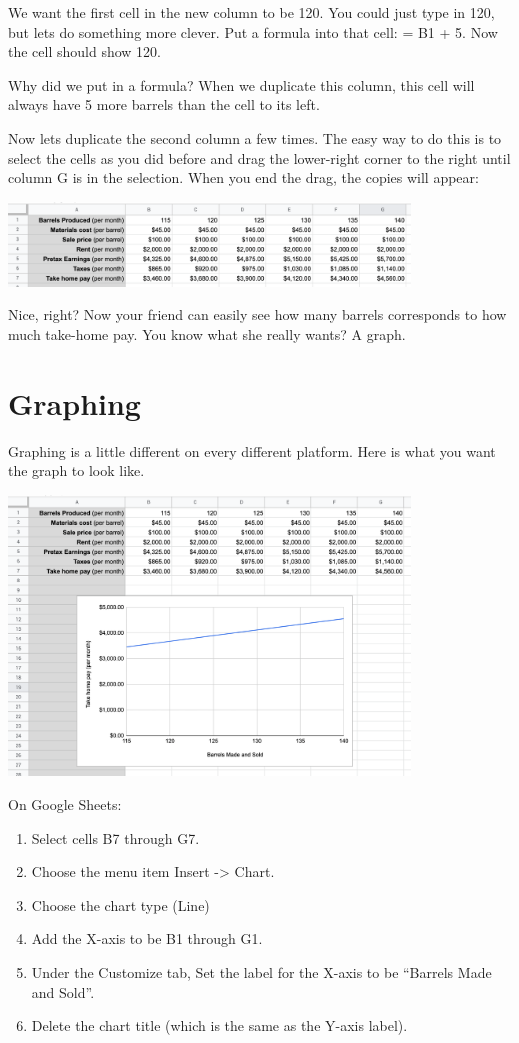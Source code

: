 We want the first cell in the new column to be 120. You could just
type in 120, but lets do something more clever.  Put a formula into that
cell: = B1 + 5.  Now the cell should show 120.

Why did we put in a formula? When we duplicate this column, this cell
will always have 5 more barrels than the cell to its left.

Now lets duplicate the second column a few times. The easy way to do
this is to select the cells as you did before and drag the lower-right
corner to the right until column G is in the selection. When you end
the drag, the copies will appear:

\includegraphics[width=0.8\textwidth]{BarrelDragPaste.png}

Nice, right? Now your friend can easily see how many barrels
corresponds to how much take-home pay. You know what she really wants? A graph.

\section{Graphing}

Graphing is a little different on every different platform.  Here is what you want the graph to look like.

\includegraphics[width=0.8\textwidth]{BarrelGraph.png}

On Google Sheets:

\begin{enumerate}
\item Select cells B7 through G7.
\item Choose the menu item Insert -> Chart.
\item Choose the chart type (Line)
\item Add the X-axis to be B1 through G1.
\item Under the Customize tab, Set the label for the X-axis to be ``Barrels Made and Sold''.
\item Delete the chart title (which is the same as the Y-axis label).
\end{enumerate}

